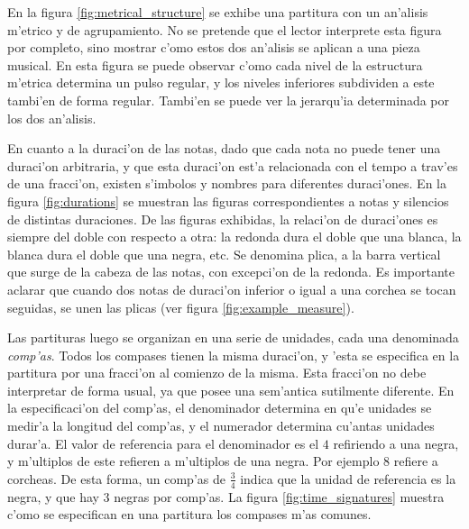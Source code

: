 \begin{imagen}
    \width{10cm}
\end{imagen}

En la figura \ref{fig:metrical_structure} se exhibe una partitura con un an'alisis m'etrico y de agrupamiento. 
No se pretende que el lector interprete esta figura por completo, sino mostrar c'omo estos dos an'alisis se aplican a una pieza musical. 
En esta figura se puede observar c'omo cada nivel de la estructura m'etrica determina un pulso regular, 
y los niveles inferiores subdividen a este tambi'en de forma regular. Tambi'en se puede ver la jerarqu'ia determinada por los dos an'alisis.


En cuanto a la duraci'on de las notas, dado que cada nota no puede tener una duraci'on arbitraria, y que esta duraci'on est'a relacionada con el tempo
a trav'es de una fracci'on, existen s'imbolos y nombres para diferentes duraci'ones. 
En la figura \ref{fig:durations} se muestran las figuras correspondientes a notas y silencios de distintas duraciones. De las figuras exhibidas, la relaci'on de duraci'ones
es siempre del doble con respecto a otra: la redonda dura el doble que una blanca, la blanca dura el doble que una negra, etc. 
Se denomina plica, a la barra vertical que surge 
de la cabeza de las notas, con excepci'on de la redonda. Es importante aclarar que cuando dos notas de duraci'on inferior o igual a una corchea se tocan seguidas, 
se unen las plicas (ver figura \ref{fig:example_measure}).

\begin{imagen}
    \width{10cm}
\end{imagen}

Las partituras luego se organizan en una serie de unidades, cada una denominada \emph{comp'as}. Todos los compases tienen la misma duraci'on, y 'esta se especifica
en la partitura por una fracci'on al comienzo de la misma. Esta fracci'on no debe interpretar de forma usual, ya que posee una sem'antica sutilmente diferente.
En la especificaci'on del comp'as, el denominador determina en qu'e unidades se medir'a la longitud del comp'as, y el numerador determina cu'antas unidades 
durar'a. El valor de referencia para el denominador es el $4$ refiriendo a una negra, y m'ultiplos de este refieren a m'ultiplos de una negra. Por ejemplo
$8$ refiere a corcheas.  De esta forma, un comp'as de $\frac{3}{4}$ indica que la unidad de referencia es la negra, y que hay $3$ negras por comp'as.
La figura \ref{fig:time_signatures} muestra c'omo se especifican en una partitura los compases m'as comunes.

